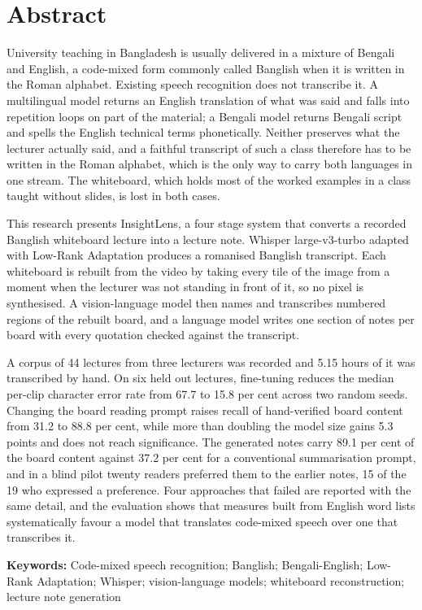 \section*{Abstract}

University teaching in Bangladesh is usually delivered in a mixture of Bengali and
English, a code-mixed form commonly called Banglish when it is written in the Roman
alphabet. Existing speech recognition does not transcribe it. A multilingual model
returns an English translation of what was said and falls into repetition loops on part
of the material; a Bengali model returns Bengali script and spells the English technical
terms phonetically. Neither preserves what the lecturer actually said, and a faithful
transcript of such a class therefore has to be written in the Roman alphabet, which is
the only way to carry both languages in one stream. The whiteboard, which holds most of
the worked examples in a class taught without slides, is lost in both cases.

This research presents InsightLens, a four stage system that converts a recorded Banglish
whiteboard lecture into a lecture note. Whisper large-v3-turbo adapted with Low-Rank
Adaptation produces a romanised Banglish transcript. Each whiteboard is rebuilt from the
video by taking every tile of the image from a moment when the lecturer was not standing
in front of it, so no pixel is synthesised. A vision-language model then names and
transcribes numbered regions of the rebuilt board, and a language model writes one
section of notes per board with every quotation checked against the transcript.

A corpus of 44 lectures from three lecturers was recorded and 5.15 hours of it was
transcribed by hand. On six held out lectures, fine-tuning reduces the median per-clip
character error rate from 67.7 to 15.8 per cent across two random seeds. Changing the
board reading prompt raises recall of hand-verified board content from 31.2 to 88.8 per
cent, while more than doubling the model size gains 5.3 points and does not reach
significance. The generated notes carry 89.1 per cent
of the board content against 37.2 per cent for a conventional summarisation prompt, and
in a blind pilot twenty readers preferred them to the earlier notes, 15 of the 19 who
expressed a preference. Four
approaches that failed are reported with the same detail, and the evaluation shows that
measures built from English word lists systematically favour a model that translates
code-mixed speech over one that transcribes it.

\vspace{1cm}
\textbf{Keywords:} Code-mixed speech recognition; Banglish; Bengali-English; Low-Rank
Adaptation; Whisper; vision-language models; whiteboard reconstruction; lecture note
generation
\pagebreak
